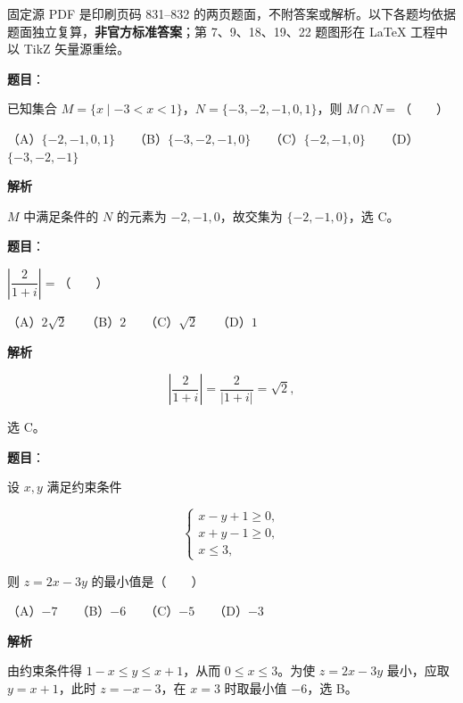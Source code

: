 

\begin{gktip}
固定源 PDF 是印刷页码 831–832 的两页题面，不附答案或解析。以下各题均依据题面独立复算，\textbf{非官方标准答案}；第 7、9、18、19、22 题图形在 LaTeX 工程中以 TikZ 矢量源重绘。
\end{gktip}


\begin{answer}

\textbf{题目}：

已知集合 $M=\{x\mid-3<x<1\}$，$N=\{-3,-2,-1,0,1\}$，则 $M\cap N=$\mbox{（　　）}

（A）$\{-2,-1,0,1\}$　　（B）$\{-3,-2,-1,0\}$　　（C）$\{-2,-1,0\}$　　（D）$\{-3,-2,-1\}$

\textbf{解析}

$M$ 中满足条件的 $N$ 的元素为 $-2,-1,0$，故交集为 $\{-2,-1,0\}$，选 C。


\end{answer}
\begin{answer}

\textbf{题目}：

$\left|\dfrac{2}{1+i}\right|=$\mbox{（　　）}

（A）$2\sqrt2$　　（B）$2$　　（C）$\sqrt2$　　（D）$1$

\textbf{解析}

\nopagebreak[4]
\[\left|\frac2{1+i}\right|=\frac2{|1+i|}=\sqrt2,\]

选 C。


\end{answer}
\begin{answer}

\textbf{题目}：

设 $x,y$ 满足约束条件

\nopagebreak[4]
\[
\begin{cases}
x-y+1\geqslant0,\\
x+y-1\geqslant0,\\
x\leqslant3,
\end{cases}
\]

则 $z=2x-3y$ 的最小值是\mbox{（　　）}

（A）$-7$　　（B）$-6$　　（C）$-5$　　（D）$-3$

\textbf{解析}

由约束条件得 $1-x\leqslant y\leqslant x+1$，从而 $0\leqslant x\leqslant3$。为使 $z=2x-3y$ 最小，应取 $y=x+1$，此时 $z=-x-3$，在 $x=3$ 时取最小值 $-6$，选 B。


\end{answer}
